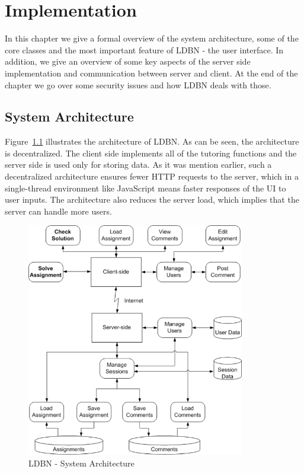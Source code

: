 \chapter{Implementation}
\label{chap:impl}
In this chapter we give a formal overview of the system architecture,
some of the core classes and the most important
feature of LDBN - the user interface. In addition, we give an overview
of some key aspects of the server side implementation and communication
between server and client. At the end of the chapter we go over some
security issues and how LDBN deals with those. 

\section{System Architecture}
Figure~\ref{fig:sysarch} illustrates the architecture of LDBN. 
As can be seen, the architecture is decentralized. The client side implements 
all of the tutoring functions and the server side is used only for storing data.
As it was mention earlier, such a decentralized architecture ensures fewer HTTP requests to
the server, which in a single-thread environment like JavaScript means faster 
responses of the UI to user inputs. The architecture also reduces the server load,
which implies that the server can handle more users.

\begin{figure}[h]
	\begin{center}
		\includegraphics[width=0.85\textwidth]{./img/architecture01a.png}
		\caption{LDBN - System Architecture}
		\label{fig:sysarch}
	\end{center}
\end{figure}

